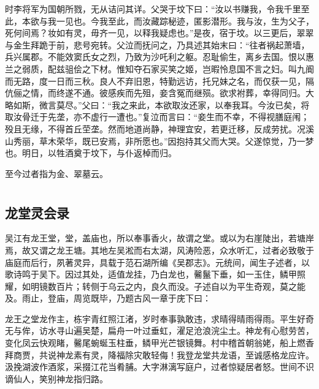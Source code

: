 \documentclass[a4paper,12pt,UTF8,twoside]{ctexbook}
\begin{document}
时李将军为国朝所戮，无从诘问其详。父哭于坟下曰：“汝以书赚我，令我千里至此，本欲与我一见也。今我至此，而汝藏踪秘迹，匿影潜形。我与汝，生为父子，死何间焉？妆如有灵，毋齐一见，以释我疑虑也。”是夜，宿于坟。以三更后，翠翠与金生拜跪于前，悲号宛转。父泣而抚问之，乃具述其始末曰：“往者祸起萧墙，兵兴属郡。不能效窦氏女之烈，乃致为沙吒利之躯。忍耻偷生，离乡去国。恨以惠兰之弱质，配兹驵侩之下材。惟知夺石家买笑之姬，岂暇怜息国不言之妇。叫九阍而无路，度一日而三秋。良人不弃旧恩，特勤远访，托兄妹之名，而仅获一见，隔伉俪之情，而终遂不通。彼感疾而先殂，妾含冤而继殒。欲求袝葬，幸得同归。大略如斯，微言莫尽。”父曰：“我之来此，本欲取汝还家，以奉我耳。今汝已矣，将取汝骨迁于先垄，亦不虚行一遭也。”复泣而言曰：“妾生而不幸，不得视膳庭闱；殁且无缘，不得首丘茔垄。然而地道尚静，神理宜安，若更迁移，反成劳扰。况溪山秀丽，草木荣华，既已安焉，非所愿也。”因抱持其父而大哭。父遂惊觉，乃一梦也。明日，以牲酒奠于坟下，与仆返棹而归。

至今过者指为金、翠墓云。

\part{}

\chapter{龙堂灵会录}

吴江有龙王堂，堂，盖庙也，所以奉事香火，故谓之堂。或以为右崖陡出，若塘岸焉，故又谓之龙王塘。其地左吴淞而右太湖，风涛险恶，众水听汇，过者必致敬于庙庭而后行，夙著灵异，具载于范石湖所编《吴郡志》。元统间，闻生子述者，以歌诗鸣于吴下。因过其处，适值龙挂，乃白龙也，毊鬣下垂，如一玉住，鳞甲照耀，如明镜数百片；转侧于乌云之内，良久而没。子述自以为平生奇观，莫之能及。雨止，登庙，周览既毕，乃题古风一章于庑下曰：

龙王之堂龙作主，栋宇青红照江渚，岁时奉事孰敢违，求晴得晴雨得雨。平生好奇无与侔，访水寻山遍吴楚，扁舟一叶过垂虹，濯足沧浪浣尘土。神龙有心慰劳苦，变化凤云快观睹，毊尾蜿蜒玉柱垂，鳞甲光芒银镜舞。村中稽首朝翁姥，船上燃香拜商贾，共说神龙素有灵，降福除灾敢轻侮！我登龙堂共龙语，至诚感格龙应许。汲挽湖波作酒浆，采掇江花当肴脯。大字淋漓写庭户，过者惊疑居者怒。世间不识谪仙人，笑别神龙指归路。
\end{document}
